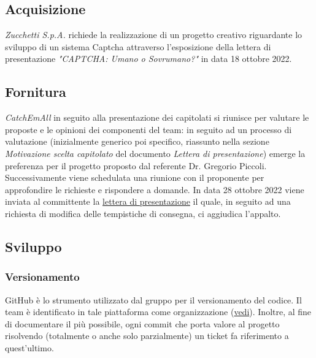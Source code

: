 \subsection{Acquisizione}
\textit{Zucchetti S.p.A.} richiede la realizzazione di un progetto creativo riguardante lo sviluppo di un sistema Captcha attraverso l'esposizione della lettera di presentazione \textit{"CAPTCHA: Umano o Sovrumano?"} in data 18 ottobre 2022.

\subsection{Fornitura}
\textit{CatchEmAll} in seguito alla presentazione dei capitolati si riunisce per valutare le proposte e le opinioni dei componenti del team: in seguito ad un processo di valutazione (inizialmente generico poi specifico, riassunto nella sezione \textit{Motivazione scelta capitolato} del documento \textit{Lettera di presentazione}) emerge la preferenza per il progetto proposto dal referente Dr. Gregorio Piccoli.  
Successivamente viene schedulata una riunione con il proponente per approfondire le richieste e rispondere a domande. 
In data 28 ottobre 2022 viene inviata al committente la \href{https://github.com/catchEmAll-SWE/catchEmAll-Docs/blob/main/Assegnazione appalti/LetteraCandidatura.pdf}{lettera di presentazione} il quale, in seguito ad una richiesta di modifica delle tempistiche di consegna, ci aggiudica l'appalto.

\subsection{Sviluppo}
    \subsubsection{Versionamento}
    GitHub è lo strumento utilizzato dal gruppo per il versionamento del codice.
    Il team è identificato in tale piattaforma come organizzazione (\href{https://github.com/catchEmAll-SWE}{vedi}).
    Inoltre, al fine di documentare il più possibile, ogni commit che porta valore al progetto risolvendo (totalmente o anche solo parzialmente) un ticket fa riferimento a quest'ultimo. 
    
